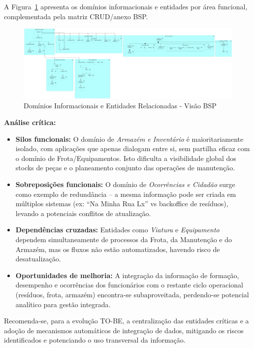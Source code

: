 \documentclass[12pt,a4paper,final]{article}
\begin{document}
    A Figura~\ref{fig:q14-domains} apresenta os domínios informacionais e entidades por área funcional, complementada pela matriz CRUD/anexo BSP.

    \begin{figure}[H]
        \centering
        \includegraphics[width=\textwidth]{Q14.png}
        \caption{Domínios Informacionais e Entidades Relacionadas - Visão BSP}
        \label{fig:q14-domains}
    \end{figure}

    \textbf{Análise crítica:}
    \begin{itemize}
        \item \textbf{Silos funcionais:} O domínio de \textit{Armazém e Inventário} é maioritariamente isolado, com aplicações que apenas dialogam entre si, sem partilha eficaz com o domínio de Frota/Equipamentos. Isto dificulta a visibilidade global dos stocks de peças e o planeamento conjunto das operações de manutenção.
        \item \textbf{Sobreposições funcionais:} O domínio de \textit{Ocorrências e Cidadão} surge como exemplo de redundância – a mesma informação pode ser criada em múltiplos sistemas (ex: “Na Minha Rua Lx” vs backoffice de resíduos), levando a potenciais conflitos de atualização.
        \item \textbf{Dependências cruzadas:} Entidades como \textit{Viatura} e \textit{Equipamento} dependem simultaneamente de processos da Frota, da Manutenção e do Armazém, mas os fluxos não estão automatizados, havendo risco de desatualização.
        \item \textbf{Oportunidades de melhoria:} A integração da informação de formação, desempenho e ocorrências dos funcionários com o restante ciclo operacional (resíduos, frota, armazém) encontra-se subaproveitada, perdendo-se potencial analítico para gestão integrada.
    \end{itemize}

    Recomenda-se, para a evolução TO-BE, a centralização das entidades críticas e a adoção de mecanismos automáticos de integração de dados, mitigando os riscos identificados e potenciando o uso transversal da informação.
\end{document}
